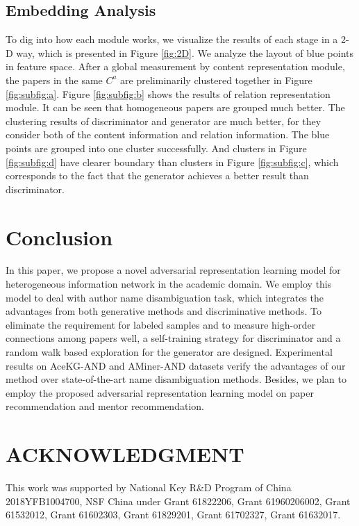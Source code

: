 \documentclass[letterpaper]{article}
\begin{document}
\subsection{Embedding Analysis}
To dig into how each module works, we visualize the results of each stage in a 2-D way, which is presented in Figure \ref{fig:2D}.
We analyze the layout of blue points in feature space.
After a global measurement by content representation module, the papers in the same $C^a$ are preliminarily clustered together in Figure \ref{fig:subfig:a}.
Figure \ref{fig:subfig:b} shows the results of relation representation module. It can be seen that homogeneous papers are grouped much better.
The clustering results of discriminator and generator are much better, for they consider both of the content information and relation information.
The blue points are grouped into one cluster successfully.
And clusters in Figure \ref{fig:subfig:d} have clearer boundary than clusters in Figure \ref{fig:subfig:c}, which corresponds to the fact that the generator achieves a better result than discriminator.

\section{Conclusion}
In this paper, we propose a novel adversarial representation learning model for heterogeneous information network in the academic domain.
We employ this model to deal with author name disambiguation task, which integrates the advantages from both generative methods and discriminative methods.
To eliminate the requirement for labeled samples and to measure high-order connections among papers well, a self-training strategy for discriminator and a random walk based exploration for the generator are designed.
Experimental results on AceKG-AND and AMiner-AND datasets verify the advantages of our method over state-of-the-art name disambiguation methods.
Besides, we plan to employ the proposed adversarial representation learning model on paper recommendation and mentor recommendation.

\section{ACKNOWLEDGMENT}
This work was supported by National Key R\&D Program of China 2018YFB1004700, NSF China under Grant 61822206, Grant 61960206002, Grant 61532012, Grant 61602303, Grant 61829201, Grant 61702327, Grant 61632017.
\end{document}

